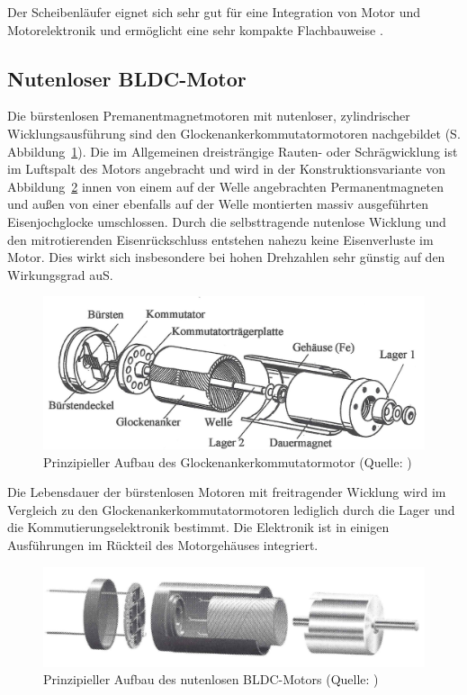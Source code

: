 Der Scheibenläufer eignet sich sehr gut für eine Integration von Motor und Motorelektronik und ermöglicht eine sehr kompakte Flachbauweise \parencite[S.  77--78]{Stölting2011}.

\subsection{Nutenloser BLDC-Motor}

Die bürstenlosen Premanentmagnetmotoren mit nutenloser, zylindrischer Wicklungsausführung sind den Glockenankerkommutatormotoren nachgebildet (S.  Abbildung~\ref{fig:3_4}). Die im Allgemeinen dreisträngige Rauten- oder Schrägwicklung ist im Luftspalt des Motors angebracht und wird in der Konstruktionsvariante von Abbildung~\ref{fig:3_5} innen von einem auf der Welle angebrachten Permanentmagneten und außen von einer ebenfalls auf der Welle montierten massiv ausgeführten Eisenjochglocke umschlossen. Durch die selbsttragende nutenlose Wicklung und den mitrotierenden Eisenrückschluss entstehen nahezu keine Eisenverluste im Motor. Dies wirkt sich insbesondere bei hohen Drehzahlen sehr günstig auf den Wirkungsgrad auS. 

\begin{figure}[h]
    \centering
    \includegraphics[width=14cm]{./Grafiken/3_4}
    \caption[Prinzipieller Aufbau des Glockenankerkommutatormotor]{Prinzipieller Aufbau des Glockenankerkommutatormotor (Quelle: \parencite[S.  30]{Stölting2011})}%
    \label{fig:3_4}
\end{figure}

Die Lebensdauer der bürstenlosen Motoren mit freitragender Wicklung wird im Vergleich zu den Glockenankerkommutatormotoren lediglich durch die Lager und die Kommutierungselektronik bestimmt. Die Elektronik ist in einigen Ausführungen im Rückteil des Motorgehäuses integriert.

\begin{figure}[h]
  \centering
  \includegraphics[width=14cm]{./Grafiken/3_5}
  \caption[Prinzipieller Aufbau des nutenlosen BLDC-Motors]{Prinzipieller Aufbau des nutenlosen BLDC-Motors (Quelle: \parencite[S.  78]{Stölting2011})}%
  \label{fig:3_5}
\end{figure}

